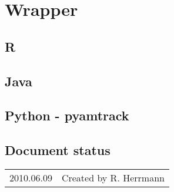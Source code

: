 
\chapter{Wrapper}

\section{R}

\section{Java}

\section{Python - pyamtrack}

\section*{Document status}
\begin{tabular}{l l}
2010.06.09&Created by R. Herrmann
\end{tabular}